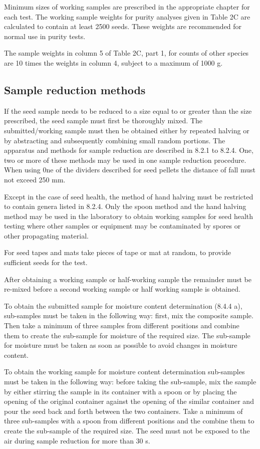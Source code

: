 \documentclass[
]{book}
\begin{document}
Minimum sizes of working samples are prescribed in the appropriate chapter for each test. The working sample weights for purity analyses given in Table 2C are calculated to contain at least 2500 seeds. These weights are recommended for normal use in purity tests.

The sample weights in column 5 of Table 2C, part 1, for counts of other species are 10 times the weights in column 4, subject to a maximum of 1000 g.

\hypertarget{sample-reduction-methods}{%
\subsection{Sample reduction methods}\label{sample-reduction-methods}}

If the seed sample needs to be reduced to a size equal to or greater than the size prescribed, the seed sample must first be thoroughly mixed. The submitted/working sample must then be obtained either by repeated halving or by abstracting and subsequently combining small random portions. The apparatus and methods for sample reduction are described in 8.2.1 to 8.2.4. One, two or more of these methods may be used in one sample reduction procedure. When using 0ne of the dividers described for seed pellets the distance of fall must not exceed 250 mm.

Except in the case of seed health, the method of hand halving must be restricted to contain genera listed in 8.2.4. Only the spoon method and the hand halving method may be used in the laboratory to obtain working samples for seed health testing where other samples or equipment may be contaminated by spores or other propagating material.

For seed tapes and mats take pieces of tape or mat at random, to provide sufficient seeds for the test.

After obtaining a working sample or half-working sample the remainder must be re-mixed before a second working sample or half working sample is obtained.

To obtain the submitted sample for moisture content determination (8.4.4 a), sub-samples must be taken in the following way: first, mix the composite sample. Then take a minimum of three samples from different positions and combine them to create the sub-sample for moisture of the required size. The sub-sample for moisture must be taken as soon as possible to avoid changes in moisture content.

To obtain the working sample for moisture content determination sub-samples must be taken in the following way: before taking the sub-sample, mix the sample by either stirring the sample in its container with a spoon or by placing the opening of the original container against the opening of the similar container and pour the seed back and forth between the two containers. Take a minimum of three sub-samples with a spoon from different positions and the combine them to create the sub-sample of the required size. The seed must not be exposed to the air during sample reduction for more than 30 s.
\end{document}
